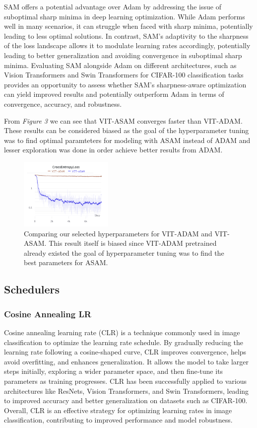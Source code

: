 \documentclass{article}
\begin{document}
SAM offers a potential advantage over Adam by addressing the issue of suboptimal sharp minima in deep learning optimization.
While Adam performs well in many scenarios, it can struggle when faced with sharp minima, potentially leading to less optimal solutions.
In contrast, SAM's adaptivity to the sharpness of the loss landscape allows it to modulate learning rates accordingly, potentially leading to better generalization and avoiding convergence in suboptimal sharp minima.
Evaluating SAM alongside Adam on different architectures, such as Vision Transformers and Swin Transformers for CIFAR-100 classification tasks provides an opportunity to assess whether SAM's sharpness-aware optimization can yield improved results and potentially outperform Adam in terms of convergence, accuracy, and robustness.

From \textit{Figure 3} we can see that VIT-ASAM converges faster than VIT-ADAM.
These results can be considered biased as the goal of the hyperparameter tuning was to find optimal paramteters for modeling with ASAM instead of ADAM and lesser exploration was done in order achieve better results from ADAM.


\begin{figure}[ht]
    \vskip 0.2in
    \centering
    \includegraphics[width=0.4\textwidth]{optimizers.png}
    \caption{Comparing our selected hyperparameters for VIT-ADAM and VIT-ASAM. This result itself is biased since VIT-ADAM pretrained already existed the goal of hyperparameter tuning was to find the best parameters for ASAM.}
    \label{fig:foobar}
    \vskip -0.2in
\end{figure}

\subsection{Schedulers}
\subsubsection{Cosine Annealing LR}
Cosine annealing learning rate (CLR) is a technique commonly used in image classification to optimize the learning rate schedule.
By gradually reducing the learning rate following a cosine-shaped curve, CLR improves convergence, helps avoid overfitting, and enhances generalization.
It allows the model to take larger steps initially, exploring a wider parameter space, and then fine-tune its parameters as training progresses.
CLR has been successfully applied to various architectures like ResNets, Vision Transformers, and Swin Transformers, leading to improved accuracy and better generalization on datasets such as CIFAR-100.
Overall, CLR is an effective strategy for optimizing learning rates in image classification, contributing to improved performance and model robustness.
\end{document}
